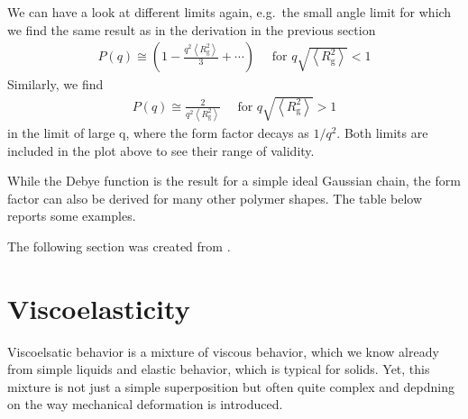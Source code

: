 \documentclass[letterpaper,10pt,english]{sphinxmanual}
\let\sphinxpxdimen\pdfpxdimen\else\newdimen\sphinxpxdimen
\begin{document}
\noindent{}

\sphinxAtStartPar
We can have a look at different limits again, e.g. the small angle limit for which we find the same result as in the derivation in the previous section
\begin{equation*}
\begin{split}P(q) \cong\left(1-\frac{q^{2}\left\langle R_{\mathrm{g}}^{2}\right\rangle}{3}+\cdots\right) \quad \text { for } q \sqrt{\left\langle R_{\mathrm{g}}^{2}\right\rangle}<1\end{split}
\end{equation*}
\sphinxAtStartPar
Similarly, we find
\begin{equation*}
\begin{split}P(q) \cong \frac{2}{q^{2}\left\langle R_{\mathrm{g}}^{2}\right\rangle} \quad \text { for } q \sqrt{\left\langle R_{\mathrm{g}}^{2}\right\rangle}>1\end{split}
\end{equation*}
\sphinxAtStartPar
in the limit of large q, where the form factor decays as \(1/q^2\). Both limits are included in the plot above to see their range of validity.

\sphinxAtStartPar
While the Debye function is the result for a simple ideal Gaussian chain, the form factor can also be derived for many other polymer shapes. The table below reports some examples.

\noindent\sphinxincludegraphics[width=700\sphinxpxdimen,height=256\sphinxpxdimen]{{form}.png}



\sphinxAtStartPar
The following section was created from .


\chapter{Viscoelasticity}
\label{\detokenize{notebooks/L23/2_Viscoelasticity:Viscoelasticity}}\label{\detokenize{notebooks/L23/2_Viscoelasticity::doc}}
\noindent\sphinxincludegraphics[width=680\sphinxpxdimen,height=257\sphinxpxdimen]{{ranges}.png}

\sphinxAtStartPar
Viscoelsatic behavior is a mixture of viscous behavior, which we know already from simple liquids and elastic behavior, which is typical for solids. Yet, this mixture is not just a simple superposition but often quite complex and depdning on the way mechanical deformation is introduced.
\end{document}
